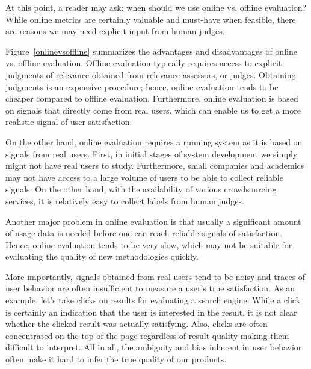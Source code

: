 At this point, a reader may ask: when should we use online vs. offline evaluation? While online metrics are certainly valuable and must-have when feasible, there are reasons we may need explicit input from human judges. 

Figure~\ref{onlinevsoffline} summarizes the advantages and disadvantages of online vs. offline evaluation. Offline evaluation typically requires access to explicit judgments of relevance obtained from relevance assessors, or judges. Obtaining judgments is an expensive procedure; hence, online evaluation tends to be cheaper compared to offline evaluation. Furthermore, online evaluation is based on signals that directly come from real users, which can enable us to get a more realistic signal of user satisfaction. 

On the other hand, online evaluation requires a running system as it is based on signals from real users. First, in initial stages of system development we simply might not have real users to study. Furthermore, small companies and academics may not have access to a large volume of users to be able to collect reliable signals. On the other hand, with the availability of various crowdsourcing services, it is relatively easy to collect labels from human judges.

Another major problem in online evaluation is that usually a significant amount of usage data is needed before one can reach reliable signals of satisfaction.  Hence, online evaluation tends to be very slow, which may not be suitable for evaluating the quality of new methodologies quickly. %

More importantly, signals obtained from real users tend to be noisy and traces of user behavior are often insufficient to measure a user's true satisfaction. As an example, let's take clicks on results for evaluating a search engine. While a click is certainly an indication that the user is interested in the result, it is not clear whether the clicked result was actually satisfying. \cite{} Also, clicks are often concentrated on the top of the page regardless of result quality  \cite{} making them difficult to interpret. All in all, the ambiguity and bias inherent in user behavior often make it hard to infer the true quality of our products. 

